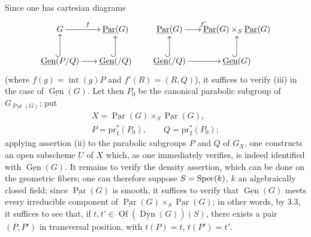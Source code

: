 Since one has cartesian diagrams
\[
\xymatrix@C=18pt@R=22pt{
G\ar[r]^f&\underline{\operatorname{Par}}(G)\\
\underline{\operatorname{Gen}}(P/Q)\ar@{^{(}->}[u]\ar[r]&\underline{\operatorname{Gen}}(/Q)\ar@{^{(}->}[u]
}
\qquad
\xymatrix@C=15pt@R=22pt{
\underline{\operatorname{Par}}(G)\ar[r]^{f'}&\underline{\operatorname{Par}}(G)\times_S\underline{\operatorname{Par}}(G)\\
\underline{\operatorname{Gen}}(/Q)\ar@{^{(}->}[u]\ar[r]&\underline{\operatorname{Gen}}(G)\ar@{^{(}->}[u]
}
\]
(where $f(g)=\operatorname{int}(g)P$ and $f'(R)=(R,Q)$), it suffices to verify (iii) in the case of $\underline{\operatorname{Gen}}(G)$. Let then $P_0$ be the canonical parabolic subgroup of $G_{\underline{\operatorname{Par}}(G)}$; put
\[
\begin{gathered}
X=\underline{\operatorname{Par}}(G)\times_S\underline{\operatorname{Par}}(G),\\
P=\mathrm{pr}_1^*(P_0),\qquad Q=\mathrm{pr}_2^*(P_0);
\end{gathered}
\]
applying assertion (ii) to the parabolic subgroups $P$ and $Q$ of $G_X$, one constructs an open subscheme $U$ of $X$ which, as one immediately verifies, is indeed identified with $\underline{\operatorname{Gen}}(G)$. It remains to verify the density assertion, which can be done on the geometric fibers; one can therefore suppose $S=\operatorname{Spec}(k)$, $k$ an algebraically closed field; since $\underline{\operatorname{Par}}(G)$ is smooth, it suffices to verify that $\underline{\operatorname{Gen}}(G)$ meets every irreducible component of $\underline{\operatorname{Par}}(G)\times_S\underline{\operatorname{Par}}(G)$; in other words, by 3.3, it suffices to see that, if $t,t'\in\underline{\operatorname{Of}}(\underline{\operatorname{Dyn}}(G))(S)$, there exists a pair $(P,P')$ in transversal position, with $t(P)=t$, $t(P')=t'$.

